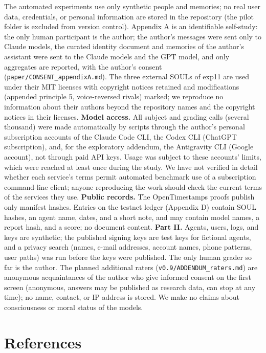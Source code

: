 \documentclass[10pt]{article}
\begin{document}
The automated experiments use only synthetic people and memories; no real user data, credentials, or personal information are stored in the repository (the pilot folder is excluded from version control). Appendix A is an identifiable self-study: the only human participant is the author; the author's messages were sent only to Claude models, the curated identity document and memories of the author's assistant were sent to the Claude models and the GPT model, and only aggregates are reported, with the author's consent (\texttt{paper/\allowbreak{}CONSENT\_\allowbreak{}appendixA.\allowbreak{}md}). The three external SOULs of exp11 are used under their MIT licenses with copyright notices retained and modifications (appended principle 5, voice-reversed rivals) marked; we reproduce no information about their authors beyond the repository names and the copyright notices in their licenses. \textbf{Model access.} All subject and grading calls (several thousand) were made automatically by scripts through the author's personal subscription accounts of the Claude Code CLI, the Codex CLI (ChatGPT subscription), and, for the exploratory addendum, the Antigravity CLI (Google account), not through paid API keys. Usage was subject to these accounts' limits, which were reached at least once during the study. We have not verified in detail whether each service's terms permit automated benchmark use of a subscription command-line client; anyone reproducing the work should check the current terms of the services they use. \textbf{Public records.} The OpenTimestamps proofs publish only manifest hashes. Entries on the testnet ledger (Appendix D) contain SOUL hashes, an agent name, dates, and a short note, and may contain model names, a report hash, and a score; no document content. \textbf{Part II.} Agents, users, logs, and keys are synthetic; the published signing keys are test keys for fictional agents, and a privacy search (names, e-mail addresses, account names, phone patterns, user paths) was run before the keys were published. The only human grader so far is the author. The planned additional raters (\texttt{v0.\allowbreak{}9/\allowbreak{}ADDENDUM\_\allowbreak{}raters.\allowbreak{}md}) are anonymous acquaintances of the author who give informed consent on the first screen (anonymous, answers may be published as research data, can stop at any time); no name, contact, or IP address is stored. We make no claims about consciousness or moral status of the models.

\section{References}\label{references}
\end{document}
